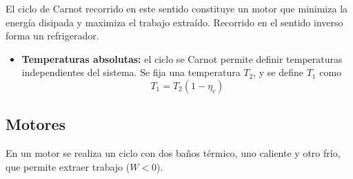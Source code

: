 El ciclo de Carnot recorrido en este sentido constituye un motor que minimiza la energía disipada y maximiza el trabajo extraído. Recorrido en el sentido inverso forma un refrigerador.

\begin{itemize}
    \item \textbf{Temperaturas absolutas:} el ciclo se Carnot permite definir temperaturas independientes del sistema. Se fija una temperatura $T_2$, y se define $T_1$ como
\[T_1 = T_2(1-\eta_c)\]
\end{itemize}

\subsection{Motores}

En un motor se realiza un ciclo con dos baños térmico, uno caliente y otro frío, que permite extraer trabajo ($W<0$).

